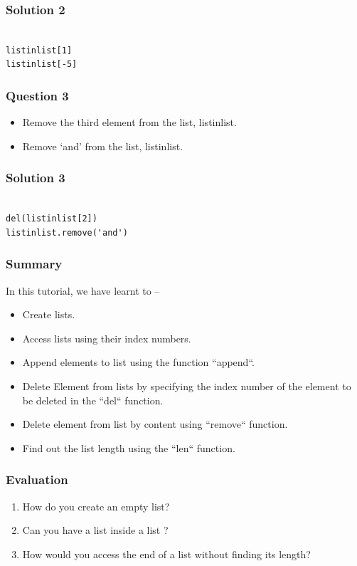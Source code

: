 \documentclass[presentation]{beamer}
\begin{document}
\begin{frame}[fragile]
\frametitle{Solution 2}
\label{sec-5}

  
\lstset{language=Python}
\begin{lstlisting}

listinlist[1]
listinlist[-5]
\end{lstlisting}
\end{frame}
\begin{frame}
\frametitle{Question 3}
\label{sec-6}



\begin{itemize}
\item Remove the third element from the list, listinlist.
\item Remove `and' from the list, listinlist.
\end{itemize}
\end{frame}
\begin{frame}[fragile]
\frametitle{Solution 3}
\label{sec-7}

\lstset{language=Python}
\begin{lstlisting}

del(listinlist[2])
listinlist.remove('and')
\end{lstlisting}
\end{frame}
\begin{frame}
\frametitle{Summary}
\label{sec-8}

  In this tutorial, we have learnt to –

\begin{itemize}
\item Create lists.
\item Access lists using their index numbers.
\item Append elements to list using the function ``append``.
\item Delete Element from lists by specifying the index number of the
    element to be deleted in the ``del`` function.
\item Delete element from list by content using ``remove`` function.
\item Find out the list length using the ``len`` function.
\end{itemize}
\end{frame}
\begin{frame}
\frametitle{Evaluation}
\label{sec-9}


\begin{enumerate}
\item How do you create an empty list?
\item Can you have a list inside a list ?
\item How would you access the end of a list without finding its length?
\end{enumerate}
\end{frame}
\end{document}
